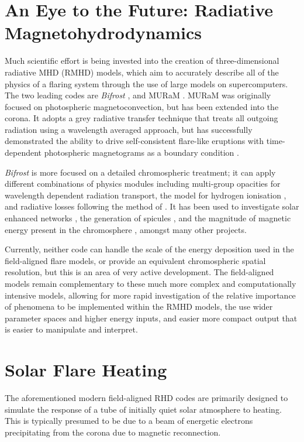 \section{An Eye to the Future: Radiative Magnetohydrodynamics}

Much scientific effort is being invested into the creation of three-dimensional radiative MHD (RMHD) models, which aim to accurately describe all of the physics of a flaring system through the use of large models on supercomputers. The two leading codes are \textit{Bifrost} \citep{Gudiksen2011}, and MURaM \citep{Rempel2009,Rempel2016}. MURaM was originally focused on photospheric magnetoconvection, but has been extended into the corona. It adopts a grey radiative transfer technique that treats all outgoing radiation using a wavelength averaged approach, but has successfully demonstrated the ability to drive self-consistent flare-like eruptions with time-dependent photospheric magnetograms as a boundary condition \citep{Cheung2019}.

\textit{Bifrost} is more focused on a detailed chromospheric treatment; it can apply different combinations of physics modules including multi-group opacities for wavelength dependent radiation transport, the \citet{Sollum1999} model for hydrogen ionisation \citep[following the treatment of][]{Leenaarts2007}, and radiative losses following the method of \citet{Carlsson2012}.
It has been used to investigate solar enhanced networks \citep{Carlsson2016}, the generation of spicules \citep{Martinez-Sykora2017}, and the magnitude of magnetic energy present in the chromosphere \citep{Martinez-Sykora2019}, amongst many other projects.

Currently, neither code can handle the scale of the energy deposition used in the field-aligned flare models, or provide an equivalent chromospheric spatial resolution, but this is an area of very active development.
The field-aligned models remain complementary to these much more complex and computationally intensive models, allowing for more rapid investigation of the relative importance of phenomena to be implemented within the RMHD models, the use wider parameter spaces and higher energy inputs, and easier more compact output that is easier to manipulate and interpret.


\section{Solar Flare Heating}

The aforementioned modern field-aligned RHD codes are primarily designed to simulate the response of a tube of initially quiet solar atmosphere to heating.
This is typically presumed to be due to a beam of energetic electrons precipitating from the corona due to magnetic reconnection.


